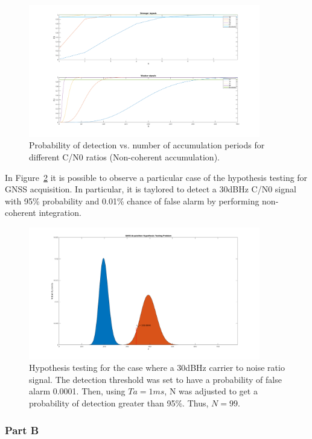 \begin{figure}[H]
	\centering
	\includegraphics[width=0.9\textwidth]{figs/Pd_vs_N.png}
	\caption{Probability of detection vs. number of accumulation periods for
		different C/N0 ratios (Non-coherent accumulation).}
	\label{fig:pd_vs_N}
\end{figure}

In Figure~\ref{fig:HT_partA_30dBHz} it is possible to observe a particular case
of the hypothesis testing for GNSS acquisition. In particular, it is taylored
to detect a 30dBHz C/N0 signal with 95\% probability and 0.01\% chance of false
alarm by performing non-coherent integration.

\begin{figure}[H]
	\centering
	\includegraphics[width=0.9\textwidth]{figs/HT_partA_30dBHz.png}
	\caption{Hypothesis testing for the case where a 30dBHz carrier to noise ratio
		signal. The detection threshold was set to have a probability of false alarm
		0.0001. Then, using $Ta=1ms$, N was adjusted to get a probability of detection
		greater than 95\%. Thus, $N=99$.}
	\label{fig:HT_partA_30dBHz}
\end{figure}

\subsubsection{Part B}

